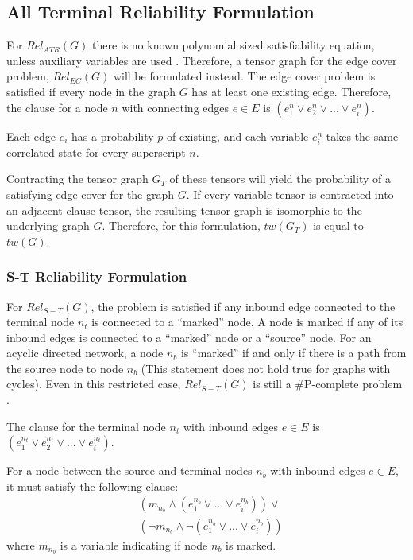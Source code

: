 \hypertarget{all-terminal-reliability-formulation}{%
\subsection{All Terminal Reliability Formulation}\label{all-terminal-reliability-formulation}}

For \(Rel_{ATR}(G)\) there is no known polynomial sized satisfiability equation, unless auxiliary variables are used \cite{paredes2019principled}. Therefore, a tensor graph for the edge cover problem, \(Rel_{EC}(G)\) will be formulated instead. The edge cover problem is satisfied if every node in the graph \(G\) has at least one existing edge. Therefore, the clause for a node \(n\) with connecting edges \(e \in E\) is \((e_1^n \lor e_2^n \lor ... \lor e_i^n)\).

Each edge \(e_i\) has a probability \(p\) of existing, and each variable \(e_i^n\) takes the same correlated state for every superscript \(n\).

Contracting the tensor graph \(G_T\) of these tensors will yield the probability of a satisfying edge cover for the graph \(G\). If every variable tensor is contracted into an adjacent clause tensor, the resulting tensor graph is isomorphic to the underlying graph \(G\). Therefore, for this formulation, \(tw(G_T)\) is equal to \(tw(G)\).

\hypertarget{s-t-reliability-formulation}{%
\subsubsection{S-T Reliability Formulation}\label{s-t-reliability-formulation}}

For \(Rel_{S-T}(G)\), the problem is satisfied if any inbound edge connected to the terminal node \(n_t\) is connected to a ``marked'' node. A node is marked if any of its inbound edges is connected to a ``marked'' node or a ``source'' node. For an acyclic directed network, a node \(n_b\) is ``marked'' if and only if there is a path from the source node to node \(n_b\) (This statement does not hold true for graphs with cycles). Even in this restricted case, \(Rel_{S-T}(G)\) is still a \#P-complete problem \cite{provan1986complexity}.

The clause for the terminal node \(n_t\) with inbound edges \(e \in E\) is \((e_1^{n_t} \lor e_2^{n_t} \lor ... \lor e_i^{n_t})\).

For a node between the source and terminal nodes \(n_b\) with inbound edges \(e \in E\), it must satisfy the following clause: \begin{equation*}
\begin{split}
& (m_{n_b} \land (e_1^{n_b} \lor ... \lor e_i^{n_b})) \lor \\
& (\neg m_{n_b} \land \neg (e_1^{n_b} \lor ... \lor e_i^{n_b}))
\end{split}
\end{equation*} where \(m_{n_b}\) is a variable indicating if node \(n_b\) is marked.

